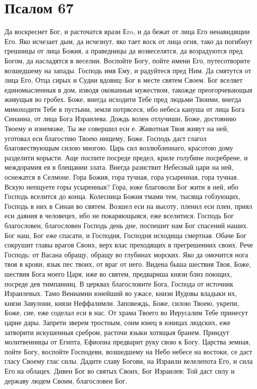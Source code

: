 \section{Псалом 67}\begin{mymulticols}



Да воскреснет Бог, и расточатся врази Еro, и да бежат от лица Его ненавидящии Его. Яко исчезает дым, да исчезнут, яко тает воск от лица огня, тако да погибнут грешницы от лица Божия, а праведницы да возвеселятся, да возрадуются пред Богом, да насладятся в веселии. Воспойте Богу, пойте имени Его, путесотворите возшедшему на запады. Господь имя Ему, и радуйтеся пред Ним. Да смятутся от лица Его, Отца сирых и Судии вдовиц: Бог в месте святем Своем. Бог вселяет единомысленныя в дом, изводя окованныя мужеством, такожде преогорчевающыя живущыя во гробех. Боже, внегда исходити Тебе пред людьми Твоими, внегда мимоходити Тебе в пустыни, земля потрясеся, ибо небеса кануша от лица Бога Синаина, от лица Бога Израилева. Дождь волен отлучиши, Боже, достоянию Твоему и изнеможе, Ты же совершил еси е. Животная Твоя живут на ней, уготовал еси благостию Твоею нищему, Боже. Господь даст глагол благовествующым силою многою. Царь сил возлюбленнаго, красотою дому разделити корысти. Аще поспите посреде предел, криле голубине посребрене, и междорамия ея в блещании злата. Внегда разнствит Небесный цари на ней, оснежатся в Селмоне. Гора Божия, гора тучная, гора усыренная, гора тучная. Вскую непщуете горы усыренныя? Гора, юже благоволи Бог жити в ней, ибо Господь вселится до конца. Колесница Божия тмами тем, тысяща гобзующих, Господь в них в Синаи во святем. Возшел еси на высоту, пленил еси плен, приял еси даяния в человецех, ибо не покаряющыяся, еже вселитися. Господь Бог благословен, благословен Господь день дне, поспешит нам Бог спасений наших. Бог наш, Бог еже спасати, и Господня, Господня исходища смертная. Обаче Бог сокрушит главы врагов Своих, верх влас преходящих в прегрешениих своих. Рече Господь: от Васана обращу, обращу во глубинах морских. Яко да омочится нога твоя в крови, язык пес твоих, от враг от него. Видена быша шествия Твоя, Боже, шествия Бога моего Царя, иже во святем, предвариша князи близ поющих, посреде дев тимпанниц. В церквах благословите Бога, Господа от источник Израилевых. Тамо Вениамин юнейший во ужасе, книзи Иудовы владыки их, князи Завулони, князи Неффалимли. Заповеждь, Боже, силою Твоею, укрепи, Боже, сие, еже соделал еси в нас. От храма Твоего во Иерусалим Тебе принесут царие дары. Запрети зверем тростным, сонм юнец в юницах людских, еже затворити искушенныя сребром, расточи языки хотящыя бранем. Приидут молитвенницы от Египта, Ефиопиа предварит руку свою к Богу. Царства земная, пойте Богу, воспойте Господеви, возшедшему на Небо небесе на востоки, се даст гласу Своему глас силы. Дадите славу Богови, на Израили велелепота Его, и сила Его на облацех. Дивен Бог во святых Своих, Бог Израилев: Той даст силу и державу людем Своим, благословен Бог.


\end{mymulticols}

